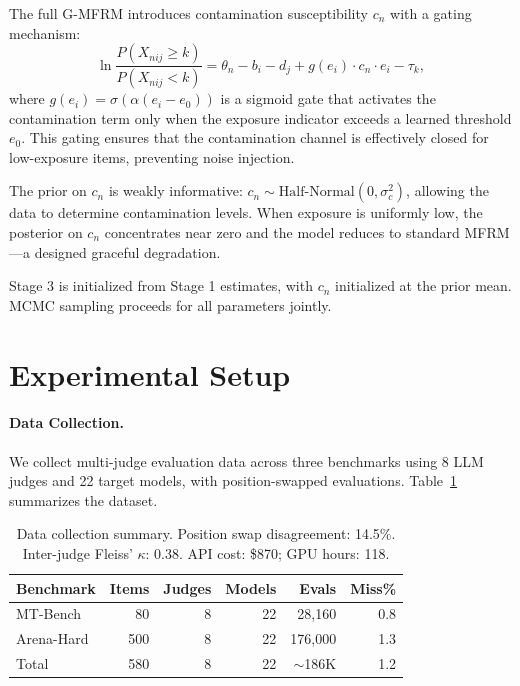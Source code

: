 \documentclass[11pt]{article}
\begin{document}
The full G-MFRM introduces contamination susceptibility $c_n$ with a gating mechanism:
\begin{equation}
    \ln\frac{P(X_{nij} \geq k)}{P(X_{nij} < k)} = \theta_n - b_i - d_j + g(e_i) \cdot c_n \cdot e_i - \tau_k,
    \label{eq:gmfrm}
\end{equation}
where $g(e_i) = \sigma(\alpha(e_i - e_0))$ is a sigmoid gate that activates the contamination term only when the exposure indicator exceeds a learned threshold $e_0$. This gating ensures that the contamination channel is effectively closed for low-exposure items, preventing noise injection.

The prior on $c_n$ is weakly informative: $c_n \sim \text{Half-Normal}(0, \sigma_c^2)$, allowing the data to determine contamination levels. When exposure is uniformly low, the posterior on $c_n$ concentrates near zero and the model reduces to standard MFRM---a designed graceful degradation.

Stage 3 is initialized from Stage 1 estimates, with $c_n$ initialized at the prior mean. MCMC sampling proceeds for all parameters jointly.

\section{Experimental Setup}
\label{sec:setup}

\paragraph{Data Collection.}
We collect multi-judge evaluation data across three benchmarks using 8 LLM judges and 22 target models, with position-swapped evaluations. Table~\ref{tab:data} summarizes the dataset.

\begin{table}[t]
\centering
\small
\begin{tabular}{lrrrrr}
\toprule
Benchmark & Items & Judges & Models & Evals & Miss\% \\
\midrule
MT-Bench & 80 & 8 & 22 & 28,160 & 0.8 \\
Arena-Hard & 500 & 8 & 22 & 176,000 & 1.3 \\
\midrule
Total & 580 & 8 & 22 & $\sim$186K & 1.2 \\
\bottomrule
\end{tabular}
\caption{Data collection summary. Position swap disagreement: 14.5\%. Inter-judge Fleiss' $\kappa$: 0.38. API cost: \$870; GPU hours: 118.}
\label{tab:data}
\end{table}
\end{document}

